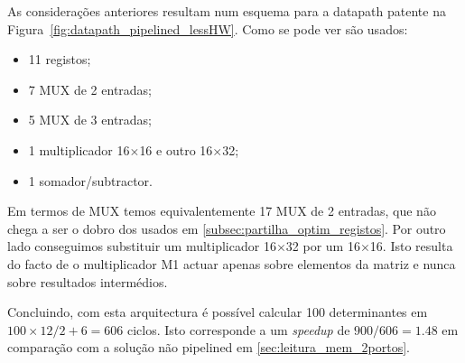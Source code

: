 \documentclass[a4paper]{article}
\begin{document}
As considerações anteriores resultam num esquema para a datapath patente na Figura~\ref{fig:datapath_pipelined_lessHW}. Como se pode ver são usados:

\begin{itemize}
\item 11 registos;
\item 7 MUX de 2 entradas;
\item 5 MUX de 3 entradas;
\item 1 multiplicador 16$\times$16 e outro 16$\times$32;
\item 1 somador/subtractor.
\end{itemize}

Em termos de MUX temos equivalentemente 17 MUX de 2 entradas, que não chega a ser o dobro dos usados em \ref{subsec:partilha_optim_registos}. Por outro lado conseguimos substituir um multiplicador 16$\times$32 por um 16$\times$16. Isto resulta do facto de o multiplicador M1 actuar apenas sobre elementos da matriz e nunca sobre resultados intermédios.

Concluindo, com esta arquitectura é possível calcular 100 determinantes em $ 100 \times 12/2 + 6 = 606 $ ciclos. Isto corresponde a um \textit{speedup} de $ 900/606 = 1.48 $ em comparação com a solução não pipelined em \ref{sec:leitura_mem_2portos}.
\end{document}
